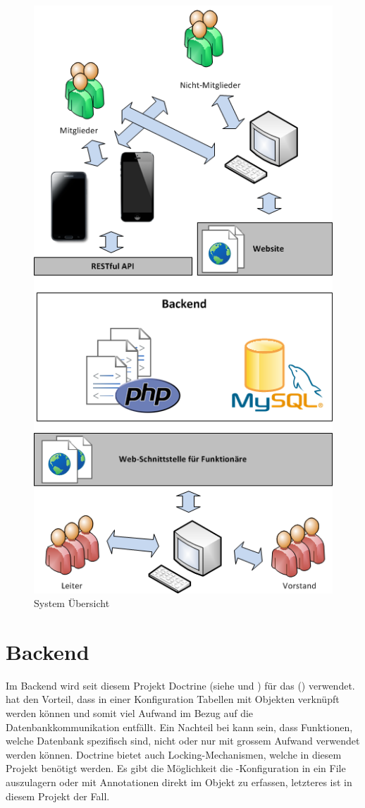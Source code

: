 \begin{figure}[h]
\centering
\includegraphics[scale=0.5]{images/visio/SystemScope.png}
\caption{System Übersicht}
\label{fig:system_scope}
\end{figure}

\section{Backend}\label{arch_backend}
Im  Backend wird seit diesem Projekt Doctrine (siehe \cite{doctrine} und \cite{dunglas2013persistence}) für das  () verwendet.  hat den Vorteil, dass in einer Konfiguration Tabellen mit Objekten verknüpft werden können und somit viel Aufwand im Bezug auf die Datenbankkommunikation entfällt. Ein Nachteil bei  kann sein, dass Funktionen, welche Datenbank spezifisch sind, nicht oder nur mit grossem Aufwand verwendet werden können. Doctrine bietet auch Locking-Mechanismen, welche in diesem Projekt benötigt werden. Es gibt die Möglichkeit die -Konfiguration in ein File auszulagern oder mit Annotationen direkt im Objekt zu erfassen, letzteres ist in diesem Projekt der Fall. 

